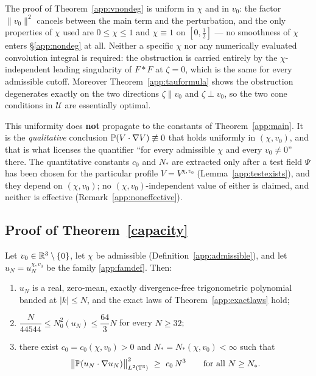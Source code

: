 \begin{remark}
\label{app:uniformity}
The proof of Theorem~\ref{app:vnondeg} is uniform in $\chi$ and in
$v_0$: the factor $\|v_0\|^2$ cancels between the main term and the
perturbation, and the only properties of $\chi$ used are $0\le\chi\le1$
and $\chi\equiv1$ on $[0,\frac12]$ --- no smoothness of $\chi$ enters
\S\ref{app:nondeg} at all. Neither a specific $\chi$ nor any numerically
evaluated convolution integral is required: the obstruction is carried
entirely by the $\chi$-independent leading singularity of $F*F$ at
$\zeta=0$, which is the same for every admissible cutoff. Moreover
Theorem~\ref{app:tauformula} shows the obstruction degenerates exactly
on the two directions $\zeta\parallel v_0$ and $\zeta\perp v_0$, so the
two cone conditions in $\mathcal U$ are essentially optimal.

This uniformity does \textbf{not} propagate to the constants of
Theorem~\ref{app:main}. It is the \emph{qualitative} conclusion
$\mathbb P(V\cdot\nabla V)\not\equiv0$ that holds uniformly in $(\chi,v_0)$,
and that is what licenses the quantifier ``for every admissible $\chi$
and every $v_0\neq0$'' there. The quantitative constants $c_0$ and
$N_*$ are extracted only after a test field $\Psi$ has been chosen for
the particular profile $V=V^{\chi,v_0}$
(Lemma~\ref{app:testexists}), and they depend on $(\chi,v_0)$; no
$(\chi,v_0)$-independent value of either is claimed, and neither is
effective (Remark~\ref{app:noneffective}).
\end{remark}

\subsection{Proof of Theorem~\ref{capacity}}
\label{app:final}

\begin{theorem}
\label{app:main}
Let $v_0\in\mathbb R^3\setminus\{0\}$, let $\chi$ be admissible
(Definition~\ref{app:admissible}), and let $u_N=u_N^{\chi,v_0}$ be the
family \eqref{app:famdef}. Then:
\begin{enumerate}
\item[(1)] $u_N$ is a real, zero-mean, exactly divergence-free
trigonometric polynomial banded at $|k|\le N$, and the exact laws of
Theorem~\ref{app:exactlaws} hold;
\item[(2)] $\dfrac{N}{44544}\le N_0^2(u_N)\le\dfrac{64}{3}N$ for every
$N\ge32$;
\item[(3)] there exist $c_0=c_0(\chi,v_0)>0$ and
$N_*=N_*(\chi,v_0)<\infty$ such that
\[
\big\|\mathbb P(u_N\cdot\nabla u_N)\big\|_{L^2(\mathbb T^3)}^{2}\ \ge\ c_0\,N^{3}
\qquad\text{for all }N\ge N_* .
\]
\end{enumerate}
\end{theorem}

